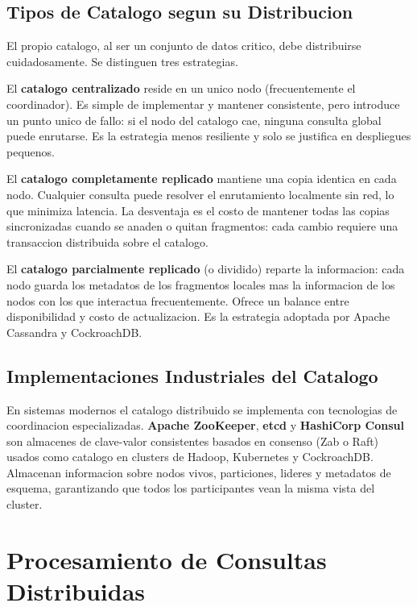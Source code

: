 \documentclass[11pt,a4paper]{article}
\begin{document}
\subsection{Tipos de Catalogo segun su Distribucion}

El propio catalogo, al ser un conjunto de datos critico, debe distribuirse cuidadosamente. Se distinguen tres estrategias.

El \textbf{catalogo centralizado} reside en un unico nodo (frecuentemente el coordinador). Es simple de implementar y mantener consistente, pero introduce un punto unico de fallo: si el nodo del catalogo cae, ninguna consulta global puede enrutarse. Es la estrategia menos resiliente y solo se justifica en despliegues pequenos.

El \textbf{catalogo completamente replicado} mantiene una copia identica en cada nodo. Cualquier consulta puede resolver el enrutamiento localmente sin red, lo que minimiza latencia. La desventaja es el costo de mantener todas las copias sincronizadas cuando se anaden o quitan fragmentos: cada cambio requiere una transaccion distribuida sobre el catalogo.

El \textbf{catalogo parcialmente replicado} (o dividido) reparte la informacion: cada nodo guarda los metadatos de los fragmentos locales mas la informacion de los nodos con los que interactua frecuentemente. Ofrece un balance entre disponibilidad y costo de actualizacion. Es la estrategia adoptada por Apache Cassandra y CockroachDB.

\subsection{Implementaciones Industriales del Catalogo}

En sistemas modernos el catalogo distribuido se implementa con tecnologias de coordinacion especializadas. \textbf{Apache ZooKeeper}, \textbf{etcd} y \textbf{HashiCorp Consul} son almacenes de clave-valor consistentes basados en consenso (Zab o Raft) usados como catalogo en clusters de Hadoop, Kubernetes y CockroachDB. Almacenan informacion sobre nodos vivos, particiones, lideres y metadatos de esquema, garantizando que todos los participantes vean la misma vista del cluster.

\section{Procesamiento de Consultas Distribuidas}
\end{document}
